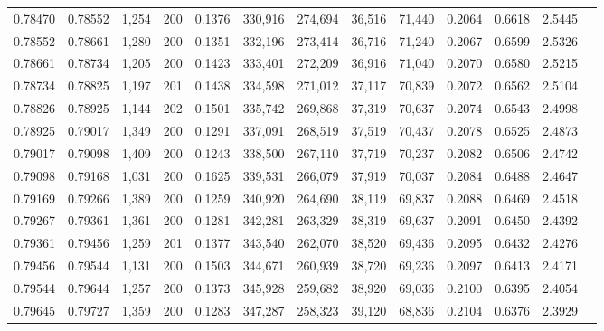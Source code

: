 \begin{tabular}{rrrrrrrrrrrrr}
0.78470 & 0.78552 & 1,254 & 200 &                                     0.1376 & 330,916 & 274,694 &  36,516 &  71,440 & 0.2064 & 0.6618 & 2.5445 \\
0.78552 & 0.78661 & 1,280 & 200 &                                     0.1351 & 332,196 & 273,414 &  36,716 &  71,240 & 0.2067 & 0.6599 & 2.5326 \\
0.78661 & 0.78734 & 1,205 & 200 &                                     0.1423 & 333,401 & 272,209 &  36,916 &  71,040 & 0.2070 & 0.6580 & 2.5215 \\
0.78734 & 0.78825 & 1,197 & 201 &                                     0.1438 & 334,598 & 271,012 &  37,117 &  70,839 & 0.2072 & 0.6562 & 2.5104 \\
0.78826 & 0.78925 & 1,144 & 202 &                                     0.1501 & 335,742 & 269,868 &  37,319 &  70,637 & 0.2074 & 0.6543 & 2.4998 \\
0.78925 & 0.79017 & 1,349 & 200 &                                     0.1291 & 337,091 & 268,519 &  37,519 &  70,437 & 0.2078 & 0.6525 & 2.4873 \\
0.79017 & 0.79098 & 1,409 & 200 &                                     0.1243 & 338,500 & 267,110 &  37,719 &  70,237 & 0.2082 & 0.6506 & 2.4742 \\
0.79098 & 0.79168 & 1,031 & 200 &                                     0.1625 & 339,531 & 266,079 &  37,919 &  70,037 & 0.2084 & 0.6488 & 2.4647 \\
0.79169 & 0.79266 & 1,389 & 200 &                                     0.1259 & 340,920 & 264,690 &  38,119 &  69,837 & 0.2088 & 0.6469 & 2.4518 \\
0.79267 & 0.79361 & 1,361 & 200 &                                     0.1281 & 342,281 & 263,329 &  38,319 &  69,637 & 0.2091 & 0.6450 & 2.4392 \\
0.79361 & 0.79456 & 1,259 & 201 &                                     0.1377 & 343,540 & 262,070 &  38,520 &  69,436 & 0.2095 & 0.6432 & 2.4276 \\
0.79456 & 0.79544 & 1,131 & 200 &                                     0.1503 & 344,671 & 260,939 &  38,720 &  69,236 & 0.2097 & 0.6413 & 2.4171 \\
0.79544 & 0.79644 & 1,257 & 200 &                                     0.1373 & 345,928 & 259,682 &  38,920 &  69,036 & 0.2100 & 0.6395 & 2.4054 \\
0.79645 & 0.79727 & 1,359 & 200 &                                     0.1283 & 347,287 & 258,323 &  39,120 &  68,836 & 0.2104 & 0.6376 & 2.3929 \\

\end{tabular}
